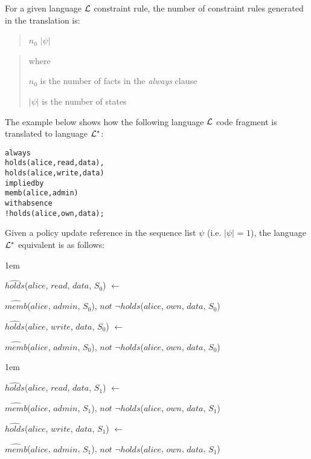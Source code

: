 \documentclass[11pt]{report}
\newenvironment{vverbatim}
{
  \begin{alltt}
}
{
    \vspace{-\baselineskip}
  \end{alltt}
}
\newenvironment{vquote}
{
  \begin{list}{}{\leftmargin 1em}\item[]
}
{
  \end{list}
}
\begin{document}
            For a given language ${\cal L}$ constraint rule, the number of
            constraint rules generated in the translation is:

            \begin{quote}
              $n_0$ $|\psi|$
            \end{quote}

            \begin{quote}
              where

              \hspace{1em}
              $n_0$ is the number of facts in the {\em always} clause

              \hspace{1em}
              $|\psi|$ is the number of states
            \end{quote}

            The example below shows how the following language ${\cal L}$ code
            fragment is translated to language ${\cal L}^{*}$:

            \begin{vverbatim}
  always
    holds(alice, read, data),
    holds(alice, write, data)
  implied by
    memb(alice, admin)
  with absence
    !holds(alice, own, data);
            \end{vverbatim}

            \noindent
            Given a policy update reference in the sequence list $\psi$ (i.e.
            $|\psi|$ = $1$), the language ${\cal L}^{*}$ equivalent is as
            follows:

            \begin{vquote}
              $\hat{holds}$($alice$, $read$, $data$, $S_{0}$) $\leftarrow$

              \hspace{1em}
              $\hat{memb}$($alice$, $admin$, $S_{0}$),
              $not$ $\lnot\hat{holds}$($alice$, $own$, $data$, $S_{0}$)

              $\hat{holds}$($alice$, $write$, $data$, $S_{0}$) $\leftarrow$

              \hspace{1em}
              $\hat{memb}$($alice$, $admin$, $S_{0}$),
              $not$ $\lnot\hat{holds}$($alice$, $own$, $data$, $S_{0}$)
            \end{vquote}

            \begin{vquote}
              $\hat{holds}$($alice$, $read$, $data$, $S_{1}$) $\leftarrow$
 
              \hspace{1em}
              $\hat{memb}$($alice$, $admin$, $S_{1}$),
              $not$ $\lnot\hat{holds}$($alice$, $own$, $data$, $S_{1}$)
 
              $\hat{holds}$($alice$, $write$, $data$, $S_{1}$) $\leftarrow$
 
              \hspace{1em}
              $\hat{memb}$($alice$, $admin$, $S_{1}$),
              $not$ $\lnot\hat{holds}$($alice$, $own$, $data$, $S_{1}$)
            \end{vquote}
\end{document}
